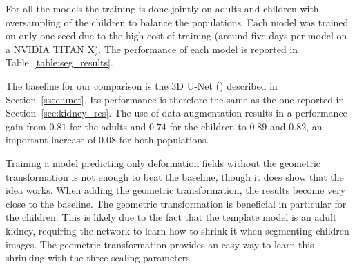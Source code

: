 For all the models the training is done jointly on adults and children with oversampling of the children to balance the populations. Each model was trained on only one seed due to the high cost of training (around five days per model on a NVIDIA TITAN X). The performance of each model is reported in Table~\ref{table:seg_results}.

The baseline for our comparison is the 3D U-Net (\textcite{cicek2016MICCAI}) described in Section~\ref{ssec:unet}. Its performance is therefore the same as the one reported in Section~\ref{sec:kidney_res}. The use of data augmentation results in a performance gain from $0.81$ for the adults and $0.74$ for the children to $0.89$ and $0.82$, an important increase of $0.08$ for both populations. 

Training a model predicting only deformation fields without the geometric transformation is not enough to beat the baseline, though it does show that the idea works. When adding the geometric transformation, the results become very close to the baseline. The geometric transformation is beneficial in particular for the children. This is likely due to the fact that the template model is an adult kidney, requiring the network to learn how to shrink it when segmenting children images. The geometric transformation provides an easy way to learn this shrinking with the three scaling parameters.



